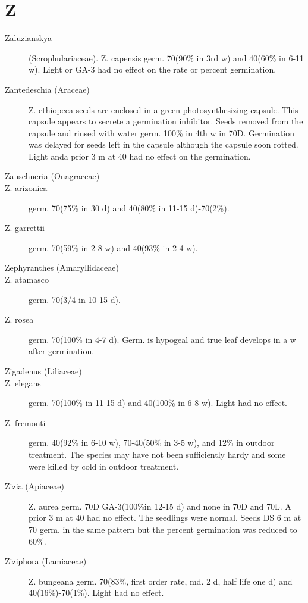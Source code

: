 \section{Z}
\begin{description}
\item[Zaluzianskya] (Scrophulariaceae). Z. capensis germ. 70(90\% in 3rd w)
and 40(60\% in 6-11 w). Light or GA-3 had no effect on the rate or percent germination.
\item[Zantedeschia (Araceae)] Z. ethiopeca seeds are enclosed in a green
photosynthesizing capsule. This capsule appears to secrete a germination inhibitor.
Seeds removed from the capsule and rinsed with water germ. 100\% in 4th w in 70D.
Germination was delayed for seeds left in the capsule although the capsule soon
rotted. Light anda prior 3 m at 40 had no effect on the germination.
\item[Zauschneria (Onagraceae)]
\item[Z. arizonica] germ. 70(75\% in 30 d) and 40(80\% in 11-15 d)-70(2\%).
\item[Z. garrettii] germ. 70(59\% in 2-8 w) and 40(93\% in 2-4 w).
\item[Zephyranthes (Amaryllidaceae)]
\item[Z. atamasco] germ. 70(3/4 in 10-15 d).
\item[Z. rosea] germ. 70(100\% in 4-7 d). Germ. is hypogeal and true leaf develops in
a w after germination.

\item[Zigadenus (Liliaceae)]
\item[Z. elegans] germ. 70(100\% in 11-15 d) and 40(100\% in 6-8 w). Light had no
effect.
\item[Z. fremonti] germ. 40(92\% in 6-10 w), 70-40(50\% in 3-5 w), and 12\% in outdoor
treatment. The species may have not been sufficiently hardy and some were killed by
cold in outdoor treatment.
\item[Zizia (Apiaceae)] Z. aurea germ. 70D GA-3(100\%in 12-15 d) and none in
70D and 70L. A prior 3 m at 40 had no effect. The seedlings were normal. Seeds DS
6 m at 70 germ. in the same pattern but the percent germination was reduced to 60\%.
\item[Ziziphora (Lamiaceae)] Z. bungeana germ. 70(83\%, first order rate, md.
2 d, half life one d) and 40(16\%)-70(1\%). Light had no effect.
\end{description}

